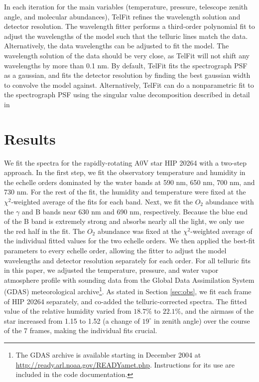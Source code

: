 In each iteration for the main variables (temperature, pressure, telescope zenith angle, and molecular abundances), TelFit refines the wavelength solution and detector resolution. The wavelength fitter performs a third-order polynomial fit to adjust the wavelengths of the model such that the telluric lines match the data. Alternatively, the data wavelengths can be adjusted to fit the model. The wavelength solution of the data should be very close, as TelFit will not shift any wavelengths by more than 0.1 nm. By default, TelFit fits the spectrograph PSF as a gaussian, and fits the detector resolution by finding the best gaussian width to convolve the model against. Alternatively, TelFit can do a nonparametric fit to the spectrograph PSF using the singular value decomposition described in detail in \cite{Rucinski1999}


\section{Results}
\label{sec:results}

We fit the spectra for the rapidly-rotating A0V star HIP 20264 with a two-step approach. In the first step, we fit the observatory temperature and humidity in the echelle orders dominated by the water bands at 590 nm, 650 nm, 700 nm, and 730 nm. For the rest of the fit, the humidity and temperature were fixed at the $\chi^2$-weighted average of the fits for each band. Next, we fit the $O_2$ abundance with the $\gamma$ and B bands near 630 nm and 690 nm, respectively. Because the blue end of the B band is extremely strong and absorbs nearly all the light, we only use the red half in the fit. The $O_2$ abundance was fixed at the $\chi^2$-weighted average of the individual fitted values for the two echelle orders. We then applied the best-fit parameters to every echelle order, allowing the fitter to adjust the model wavelengths and detector resolution separately for each order. For all telluric fits in this paper, we adjusted the temperature, pressure, and water vapor atmosphere profile with sounding data from the Global Data Assimilation System (GDAS) meteorological archive\footnote{The GDAS archive is available starting in December 2004 at \url{http://ready.arl.noaa.gov/READYamet.php}. Instructions for its use are included in the code documentation.}. As stated in Section \ref{sec:obs}, we fit each frame of HIP 20264 separately, and co-added the telluric-corrected spectra. The fitted value of the relative humidity varied from $18.7\%$ to $22.1\%$, and the airmass of the star increased from 1.15 to 1.52 (a change of $19^{\circ}$ in zenith angle) over the course of the 7 frames, making the individual fits crucial.

